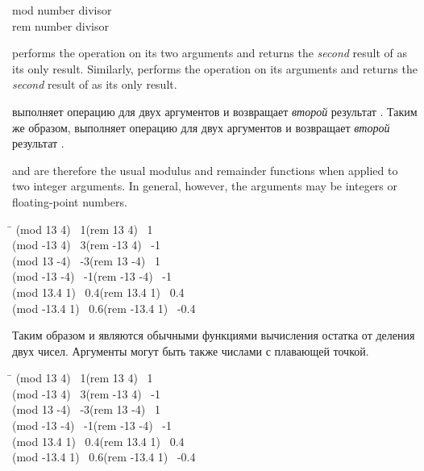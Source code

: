 \begin{defun}[Function]
mod number divisor \\
rem number divisor

 performs the operation  on its two arguments
and returns the \emph{second} result of  as its only result.
Similarly,
 performs the operation  on its arguments
and returns the \emph{second} result of  as its only result.

 выполняет операцию  для двух аргументов и возвращает
\emph{второй} результат .
Таким же образом,  выполняет операцию  для двух аргументов и возвращает
\emph{второй} результат .

 and  are therefore the usual modulus
and remainder functions when applied to two integer arguments.
In general, however, the arguments may be integers or floating-point
numbers.
\begin{lisp}
\textwidth\=\kill
(mod 13 4) \EV\ 1\>(rem 13 4) \EV\ 1 \\
(mod -13 4) \EV\ 3\>(rem -13 4) \EV\ -1 \\
(mod 13 -4) \EV\ -3\>(rem 13 -4) \EV\ 1 \\
(mod -13 -4) \EV\ -1\>(rem -13 -4) \EV\ -1 \\
(mod 13.4 1) \EV\ 0.4\>(rem 13.4 1) \EV\ 0.4 \\
(mod -13.4 1) \EV\ 0.6\>(rem -13.4 1) \EV\ -0.4
\end{lisp}

Таким образом  и  являются обычными функциями вычисления
остатка от деления двух чисел. Аргументы могут быть также числами с плавающей
точкой.
\begin{lisp}
\textwidth\=\kill
(mod 13 4) \EV\ 1\>(rem 13 4) \EV\ 1 \\
(mod -13 4) \EV\ 3\>(rem -13 4) \EV\ -1 \\
(mod 13 -4) \EV\ -3\>(rem 13 -4) \EV\ 1 \\
(mod -13 -4) \EV\ -1\>(rem -13 -4) \EV\ -1 \\
(mod 13.4 1) \EV\ 0.4\>(rem 13.4 1) \EV\ 0.4 \\
(mod -13.4 1) \EV\ 0.6\>(rem -13.4 1) \EV\ -0.4
\end{lisp}
\end{defun}

